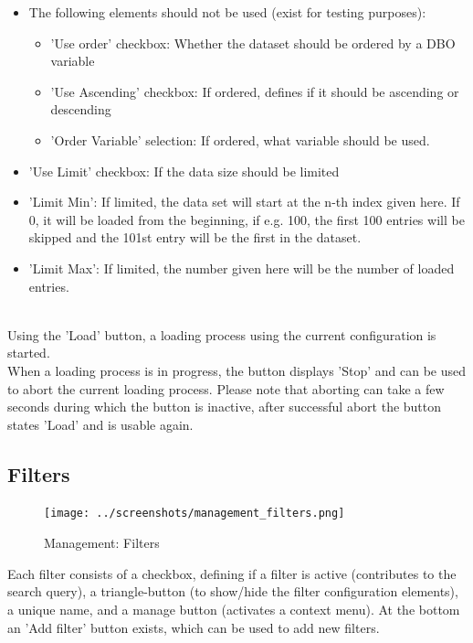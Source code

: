 \begin{itemize}
\item The following elements should not be used (exist for testing purposes):
\begin{itemize}
 \item 'Use order' checkbox: Whether the dataset should be ordered by a DBO variable
 \item 'Use Ascending' checkbox: If ordered, defines if it should be ascending or descending
 \item 'Order Variable' selection: If ordered, what variable should be used.
\end{itemize}
 \item 'Use Limit' checkbox: If the data size should be limited
 \item 'Limit Min': If limited, the data set will start at the n-th index given here. If 0, it will be loaded from the beginning, if e.g. 100, the first 100 entries will be skipped and the 101st entry will be the first in the dataset.
\item 'Limit Max': If limited, the number given here will be the number of loaded entries.
\end{itemize}
\ \\

Using the 'Load' button, a loading process using the current configuration is started.  \\

When a loading process is in progress, the button displays 'Stop' and can be used to abort the current loading process. Please note that aborting can take a few seconds during which the button is inactive, after successful abort the button states 'Load' and is usable again.

\subsection{Filters}

\begin{figure}[H]
  \center
    \texttt{[image: ../screenshots/management\_filters.png]}
  \caption{Management: Filters}
\end{figure}

Each filter consists of a checkbox, defining if a filter is active (contributes to the search query), a triangle-button (to show/hide the filter configuration elements), a unique name, and a manage button (activates a context menu). At the bottom an 'Add filter' button exists, which can be used to add new filters. \\

